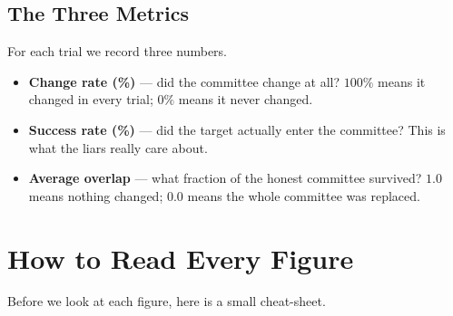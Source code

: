 \documentclass[11pt,a4paper]{article}
\begin{document}
\subsection{The Three Metrics}

For each trial we record three numbers.

\begin{itemize}
  \item \textbf{Change rate (\%)} --- did the committee change at all?
        \(100\%\) means it changed in every trial; \(0\%\) means it never
        changed.
  \item \textbf{Success rate (\%)} --- did the target actually enter the
        committee? This is what the liars really care about.
  \item \textbf{Average overlap} --- what fraction of the honest committee
        survived? \(1.0\) means nothing changed; \(0.0\) means the whole
        committee was replaced.
\end{itemize}

\section{How to Read Every Figure}

Before we look at each figure, here is a small cheat-sheet.
\end{document}
